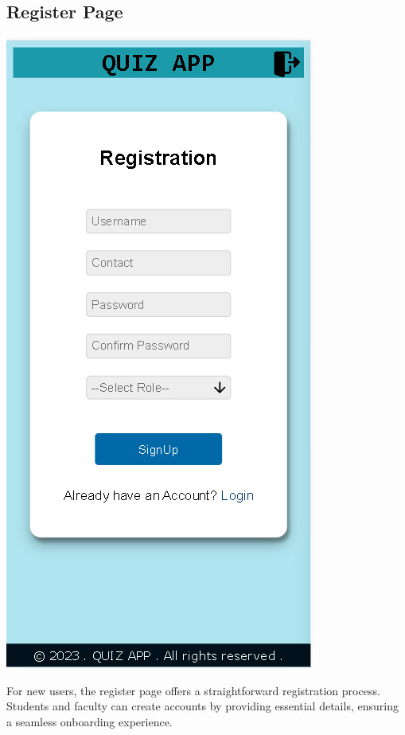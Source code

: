 \subsection{Register Page}
\begin{center}
    \includegraphics[scale=0.4]{project/images/REGISTER.png}
\end{center}

For new users, the register page offers a straightforward registration process. Students and faculty can create accounts by providing essential details, ensuring a seamless onboarding experience.

